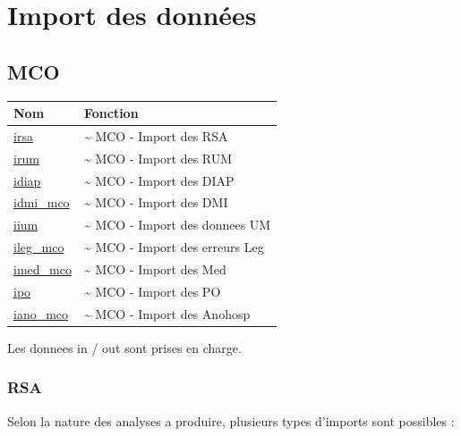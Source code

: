 \documentclass[]{book}
\begin{document}
\chapter{Import des données}\label{import-des-donnees}

\section{MCO}\label{mco}

\begin{longtable}[]{@{}ll@{}}
\toprule
Nom & Fonction\tabularnewline
\midrule
\endhead
\href{https://github.com/IM-APHP/pmeasyr/tree/master/Rd_md/irsa.Rmd}{irsa}
& \textasciitilde{} MCO - Import des RSA\tabularnewline
\href{https://github.com/IM-APHP/pmeasyr/tree/master/Rd_md/irum.Rmd}{irum}
& \textasciitilde{} MCO - Import des RUM\tabularnewline
\href{https://github.com/IM-APHP/pmeasyr/tree/master/Rd_md/idiap.Rmd}{idiap}
& \textasciitilde{} MCO - Import des DIAP\tabularnewline
\href{https://github.com/IM-APHP/pmeasyr/tree/master/Rd_md/idmi_mco.Rmd}{idmi\_mco}
& \textasciitilde{} MCO - Import des DMI\tabularnewline
\href{https://github.com/IM-APHP/pmeasyr/tree/master/Rd_md/iium.Rmd}{iium}
& \textasciitilde{} MCO - Import des donnees UM\tabularnewline
\href{https://github.com/IM-APHP/pmeasyr/tree/master/Rd_md/ileg_mco.Rmd}{ileg\_mco}
& \textasciitilde{} MCO - Import des erreurs Leg\tabularnewline
\href{https://github.com/IM-APHP/pmeasyr/tree/master/Rd_md/imed_mco.Rmd}{imed\_mco}
& \textasciitilde{} MCO - Import des Med\tabularnewline
\href{https://github.com/IM-APHP/pmeasyr/tree/master/Rd_md/ipo.Rmd}{ipo}
& \textasciitilde{} MCO - Import des PO\tabularnewline
\href{https://github.com/IM-APHP/pmeasyr/tree/master/Rd_md/iano_mco.Rmd}{iano\_mco}
& \textasciitilde{} MCO - Import des Anohosp\tabularnewline
\bottomrule
\end{longtable}

Les donnees in / out sont prises en charge.

\subsection{RSA}\label{rsa}

Selon la nature des analyses a produire, plusieurs types d'imports sont
possibles :
\end{document}
